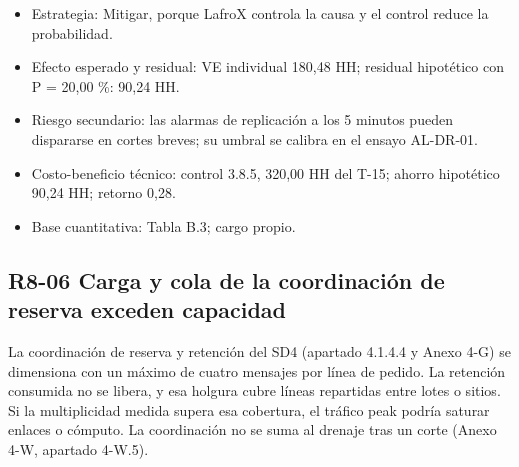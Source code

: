 \begin{itemize}[leftmargin=*,itemsep=3pt]
\item Estrategia: Mitigar, porque LafroX controla la causa y el control reduce la probabilidad.
\item Efecto esperado y residual: VE individual 180,48 HH; residual hipotético con P = 20,00 \%: 90,24 HH.
\item Riesgo secundario: las alarmas de replicación a los 5 minutos pueden dispararse en cortes breves; su umbral se calibra en el ensayo AL-DR-01.
\item Costo-beneficio técnico: control 3.8.5, 320,00 HH del T-15; ahorro hipotético 90,24 HH; retorno 0,28.
\item Base cuantitativa: Tabla B.3; cargo propio.
\end{itemize}

\subsection*{R8-06 \textemdash{} Carga y cola de la coordinación de reserva exceden capacidad}

La coordinación de reserva y retención del SD4 (apartado 4.1.4.4 y Anexo 4-G) se dimensiona con un máximo de cuatro mensajes por línea de pedido. La retención consumida no se libera, y esa holgura cubre líneas repartidas entre lotes o sitios. Si la multiplicidad medida supera esa cobertura, el tráfico peak podría saturar enlaces o cómputo. La coordinación no se suma al drenaje tras un corte (Anexo 4-W, apartado 4-W.5).

